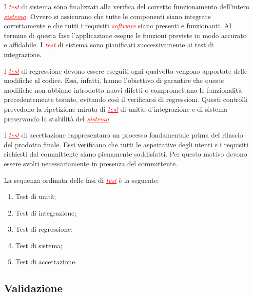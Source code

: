 I \textcolor{red}{\uline{\textit{test}}} di sistema sono finalizzati alla verifica del corretto funzionamento dell'intero \textcolor{red}{\uline{\textit{sistema}}}.
Ovvero si assicurano che tutte le componenti siano integrate correttamente e che tutti i requisiti \textcolor{red}{\uline{\textit{software}}}
siano presenti e funzionanti. Al termine di questa fase l'applicazione esegue le funzioni previste in modo accurato e affidabile.
I \textcolor{red}{\uline{\textit{test}}} di sistema sono pianificati successivamente ai test di integrazione.

I \textcolor{red}{\uline{\textit{test}}} di regressione devono essere eseguiti ogni qualvolta vengono apportate delle modifiche al codice.
Essi, infatti, hanno l'obiettivo di garantire che queste modifiche non abbiano introdotto nuovi difetti o compromettano le funzionalità
precedentemente testate, evitando così il verificarsi di regressioni. Questi controlli prevedono la ripetizione mirata di 
\textcolor{red}{\uline{\textit{test}}} di unità, d'integrazione e di sistema preservando la stabilità del \textcolor{red}{\uline{\textit{sistema}}}.

I \textcolor{red}{\uline{\textit{test}}} di accettazione rappresentano un processo fondamentale prima del rilascio del prodotto finale.
Essi verificano che tutti le aspettative degli utenti e i requisiti richiesti dal committente siano pienamente soddisfatti. Per questo motivo
devono essere svolti necessariamente in presenza del committente.

La sequenza ordinata delle fasi di \textcolor{red}{\uline{\textit{test}}} è la seguente:
\begin{enumerate}
    \item Test di unità;
    \item Test di integrazione;
    \item Test di regressione;
    \item Test di sistema;
    \item Test di accettazione.
\end{enumerate}



\subsection{Validazione}

